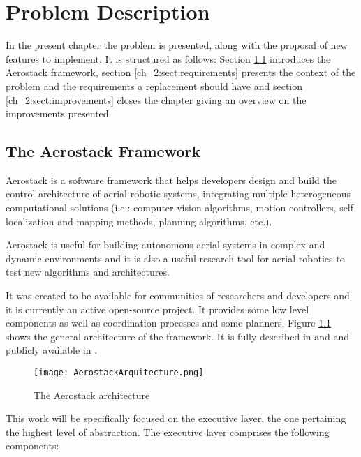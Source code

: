\chapter{Problem Description} \label{ch_2:chapter}

In the present chapter the problem is presented, along with the proposal of new features to implement. It is structured as follows: Section \ref{ch_2:sect:aerostack} introduces the Aerostack framework, section \ref{ch_2:sect:requirements} presents the context of the problem and the requirements a replacement should have and section \ref{ch_2:sect:improvements} closes the chapter giving an overview on the improvements presented.

  \section{The Aerostack Framework} \label{ch_2:sect:aerostack}

    Aerostack is a software framework that helps developers design and build the control architecture of aerial robotic systems, integrating multiple heterogeneous computational solutions (i.e.: computer vision algorithms, motion controllers, self localization and mapping methods, planning algorithms, etc.).

    Aerostack is useful for building autonomous aerial systems in complex and dynamic environments and it is also a useful research tool for aerial robotics to test new algorithms and architectures.

    It was created to be available for communities of researchers and developers and it is currently an active open-source project. It provides some low level components as well as coordination processes and some planners. Figure \ref{ch_2:fig:aerostack_arqu} shows the general architecture of the framework. It is fully described in \cite{7502591} and \cite{Sanchez-Lopez2017} and publicly available in \cite{aerostack_wiki_web}.

    \pagebreak
    \begin{figure}[ht]
      \centering
      \texttt{[image: AerostackArquitecture.png]}
      \caption{The Aerostack architecture}
      \label{ch_2:fig:aerostack_arqu}
    \end{figure}

    This work will be specifically focused on the executive layer, the one pertaining the highest level of abstraction. The executive layer comprises the following components:

